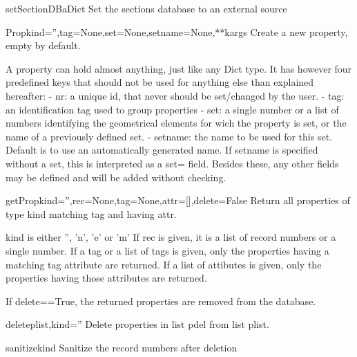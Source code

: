 \begin{funcdesc}{setSectionDB}{aDict}
Set the sections database to an external source
\end{funcdesc}

\begin{funcdesc}{Prop}{kind='',tag=None,set=None,setname=None,**kargs}
Create a new property, empty by default.

        A property can hold almost anything, just like any Dict type.
        It has however four predefined keys that should not be used for
        anything else than explained hereafter:
        - nr: a unique id, that never should be set/changed by the user.
        - tag: an identification tag used to group properties
        - set: a single number or a list of numbers identifying the geometrical
               elements for wich the property is set, or the name of a
               previously defined set.
        - setname: the name to be used for this set. Default is to use an
               automatically generated name. If setname is specified without
               a set, this is interpreted as a set= field.
        Besides these, any other fields may be defined and will be added
        without checking.
        
\end{funcdesc}

\begin{funcdesc}{getProp}{kind='',rec=None,tag=None,attr=[],delete=False}
Return all properties of type kind matching tag and having attr.

        kind is either '', 'n', 'e' or 'm'
        If rec is given, it is a list of record numbers or a single number.
        If a tag or a list of tags is given, only the properties having a
        matching tag attribute are returned.
        If a list of attibutes is given, only the properties having those
        attributes are returned.

        If delete==True, the returned properties are removed from the database.
        
\end{funcdesc}

\begin{funcdesc}{delete}{plist,kind=''}
Delete properties in list pdel from list plist.
\end{funcdesc}

\begin{funcdesc}{sanitize}{kind}
Sanitize the record numbers after deletion
\end{funcdesc}

